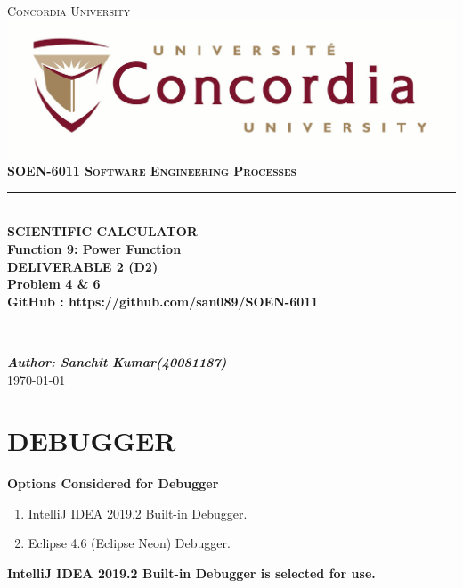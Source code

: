 \documentclass[a4paper,12pt]{article}
\newcommand{\Author}{Sanchit Kumar(40081187)}
\newcommand{\ProjectName}{Function 9: Power Function}
\newcommand{\Course}{\textbf{SOEN-6011 \vspace{0.5cm} Software Engineering Processes}}
\begin{document}

\begin{titlepage}
\newcommand{\HRule}{\rule{\linewidth}{0.5mm}} %


\centering
\textsc{\LARGE Concordia University} \\ [5mm] 
\includegraphics[scale=.1]{University_logo.jpg}\\[1cm] 
\textsc{\Large \Course} \\ [0.5cm]

	
\HRule \\[0.4cm]
{ \huge \bfseries SCIENTIFIC CALCULATOR \\ [5mm]  \ProjectName}\\[0.4cm] 
{\large \textbf{DELIVERABLE 2 (D2)} } \\ [0.2cm] 
{\large \textbf{Problem 4 \& 6} } \\ [0.2cm]
{\large \textbf{GitHub : https://github.com/san089/SOEN-6011}}	
\HRule \\[1.5cm]


\vspace{7cm}
\Large \emph{\textbf{Author: \Author}}\\
{\large \today}\\[2cm]

\vfill
\end{titlepage}	



\newpage

\section{\large DEBUGGER}
\textbf{Options Considered for Debugger}
\begin{enumerate}
	\item IntelliJ IDEA 2019.2 Built-in Debugger.
	\item Eclipse 4.6 (Eclipse Neon) Debugger.
\end{enumerate} \vspace{0.5cm}
\textbf{IntelliJ IDEA 2019.2 Built-in Debugger is selected for use.}
\end{document}
